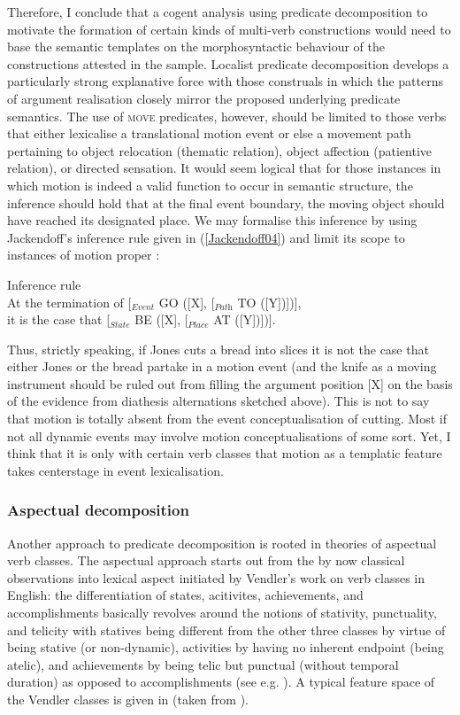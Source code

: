 Therefore, I conclude that a cogent analysis using predicate decomposition to motivate the formation of certain kinds of multi-verb constructions would need to base the semantic templates on the morphosyntactic behaviour of the constructions attested in the sample. Localist predicate decomposition develops a particularly strong explanative force with those construals in which the patterns of argument realisation closely mirror the proposed underlying predicate semantics. The use of \textsc{move} predicates, however, should be limited to those verbs that either lexicalise a translational motion event or else a movement path pertaining to object relocation (thematic relation), object affection (patientive relation), or directed sensation.
It would seem logical that for those instances in which motion is indeed a valid function to occur in semantic structure, the inference should hold that at the final event boundary, the moving object should have reached its designated place. We may formalise this inference by using Jackendoff's inference rule given in (\ref{Jackendoff04}) and limit its scope to instances of motion proper \citep[27]{Jackendoff1990}:

\ea \label{Jackendoff04} Inference rule \\
At the termination of [$_{\textit{Event}}$ GO ([X], [$_{\textit{Path}}$ TO ([Y])])], \\
it is the case that [$_{\textit{State}}$ BE ([X], [$_{\textit{Place}}$ AT ([Y])])].
\z

Thus, strictly speaking, if Jones cuts a bread into slices it is not the case that either Jones or the bread partake in a motion event (and the knife as a moving instrument should be ruled out from filling the argument position [X] on the basis of the evidence from diathesis alternations sketched above). This is not to say that motion is totally absent from the event conceptualisation of cutting. Most if not all dynamic events may involve motion conceptualisations of some sort. Yet, I think that it is only with certain verb classes that motion as a templatic feature takes centerstage in event lexicalisation.

\subsubsection{Aspectual decomposition}

Another approach to predicate decomposition is rooted in theories of aspectual verb classes. The aspectual approach starts out from the by now classical observations into lexical aspect initiated by Vendler's work on verb classes in English: the differentiation of states, acitivites, achievements, and accomplishments basically revolves around the notions of stativity, punctuality, and telicity with statives being different from the other three classes by virtue of being stative (or non-dynamic), activities by having no inherent endpoint (being atelic), and achievements by being telic but punctual (without temporal duration) as opposed to accomplishments (see e.g. \citealt{levin2005argument, croft2012verbs}). A typical feature space of the Vendler classes is given in  (taken from \citealt[93]{van1997syntax}).


